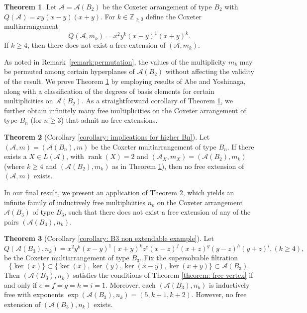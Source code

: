 \documentclass[12pt]{amsart}
\theoremstyle{definition}
\newtheorem{theorem}{Theorem}[section]
\theoremstyle{remark}
\newcommand{\rank}{\operatorname{rank}}
\newcommand\CA{{\mathscr A}}
\begin{document}
\begin{theorem}\label{theorem:MainResult}
    Let $\CA=\CA(B_2)$ be the Coxeter arrangement of type $B_2$ with $Q(\CA)=xy(x-y)(x+y)$. For $k\in\mathbb{Z}_{\geq 0}$ define the Coxeter multiarrangement $$Q(\CA,m_k)=x^2y^k(x-y)^1(x+y)^k.$$ If $k\geq 4$, then there does not exist a free extension of $(\CA,m_k)$.
\end{theorem}

As noted in Remark~\ref{remark:permutation}, the values of the multiplicity $m_k$ may be permuted among certain hyperplanes of $\CA(B_2)$ without affecting the validity of the result. We prove Theorem \ref{theorem:MainResult} by employing results of Abe and Yoshinaga, along with a classification of the degrees of basis elements for certain multiplicities on $\CA(B_2)$. As a straightforward corollary of Theorem \ref{theorem:MainResult}, we further obtain infinitely many free multiplicities on the Coxeter arrangement of type $B_n$ (for $n \geq 3$) that admit no free extensions. 

\begin{theorem}[Corollary \ref{corollary: implications for higher Bn}]\label{theorem 2}
    Let $(\CA,m)=(\CA(B_n),m)$ be the Coxeter multiarrangement of type $B_n$. If there exists a $X\in L(\CA)$, with $\rank(X)=2$ and $(\CA_X,m_X)=(\CA(B_2),m_k)$ (where $k\geq 4$ and $(\CA(B_2),m_k)$ as in Theorem \ref{theorem:MainResult}), then no free extension of $(\CA,m)$ exists.
\end{theorem}

In our final result, we present an application of Theorem \ref{theorem 2}, which yields an infinite family of inductively free multiplicities $n_k$ on the Coxeter arrangement $\CA(B_3)$ of type $B_3$, such that there does not exist a free extension of any of the pairs $(\CA(B_3),n_k)$.

\begin{theorem}[Corollary \ref{corollary: B3 non extendable example}]
    Let $$Q(\CA(B_3),n_k)=x^2 y^k (x-y)^1 (x+y)^k z^e (x-z)^f (x+z)^g (y-z)^h (y+z)^i, (k\geq 4),$$ be the Coxeter multiarrangement of type $B_3$. Fix the supersolvable filtration $$\{\ker(x)\}\subset \{\ker(x), \ker(y), \ker(x-y), \ker(x+y)\}\subset \CA(B_3).$$ Then $(\CA(B_3),n_k)$ satisfies the conditions of Theorem \ref{theorem: free vertex} if and only if $e=f=g=h=i=1$. Moreover, each $(\CA(B_3),n_k)$ is inductively free with exponents $\exp(\CA(B_3),n_k)=(5,k+1,k+2)$. However, no free extension of $(\CA(B_3),n_k)$ exists.
\end{theorem}
\end{document}
